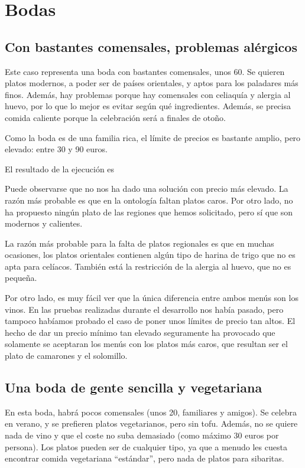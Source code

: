 % 

\section{Bodas}

\subsection{Con bastantes comensales, problemas alérgicos}
Este caso representa una boda con bastantes comensales, unos 60. Se quieren
platos modernos, a poder ser de países orientales, y aptos para los paladares
más finos. Además, hay problemas porque hay comensales con celiaquía y alergia
al huevo, por lo que lo mejor es evitar según qué ingredientes. Además, se
precisa comida caliente porque la celebración será a finales de otoño.

Como la boda es de una familia rica, el límite de precios es bastante amplio,
pero elevado: entre 30 y 90 euros.

El resultado de la ejecución es


Puede observarse que no nos ha dado una solución con precio más elevado. La
razón más probable es que en la ontología faltan platos caros. Por otro lado,
no ha propuesto ningún plato de las regiones que hemos solicitado, pero sí que
son modernos y calientes.

La razón más probable para la falta de platos regionales es que en muchas
ocasiones, los platos orientales contienen algún tipo de harina de trigo que no
es apta para celíacos. También está la restricción de la alergia al huevo, que
no es pequeña.

Por otro lado, es muy fácil ver que la única diferencia entre ambos menús son
los vinos. En las pruebas realizadas durante el desarrollo nos había pasado,
pero tampoco habíamos probado el caso de poner unos límites de precio tan
altos. El hecho de dar un precio mínimo tan elevado seguramente ha provocado
que solamente se aceptaran los menús con los platos más caros, que resultan ser
el plato de camarones y el solomillo.

\subsection{Una boda de gente sencilla y vegetariana}
En esta boda, habrá pocos comensales (unos 20, familiares y amigos). Se celebra
en verano, y se prefieren platos vegetarianos, pero sin tofu. Además, no se
quiere nada de vino y que el coste no suba demasiado (como máximo 30 euros por
persona). Los platos pueden ser de cualquier tipo, ya que a menudo les cuesta
encontrar comida vegetariana ``estándar'', pero nada de platos para sibaritas.

